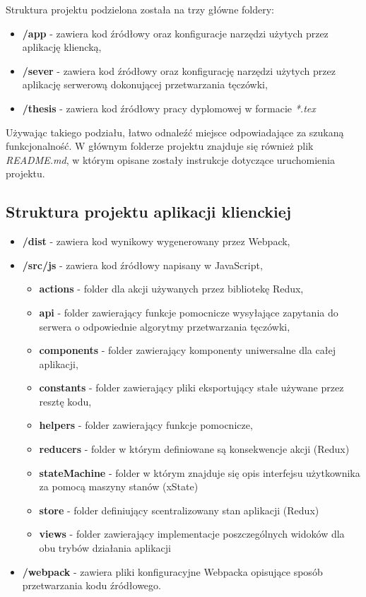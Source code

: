 \documentclass[10pt,polish,a4paper,oneside]{ppfcmthesis}
\begin{document}
Struktura projektu podzielona została na trzy główne foldery:

\begin{itemize}
  \item \textbf{/app} - zawiera kod \'zródłowy oraz konfiguracje narzędzi użytych przez aplikację
  kliencką,
  \item \textbf{/sever} - zawiera kod \'zródłowy oraz konfigurację narzędzi użytych przez aplikację
  serwerową dokonującej przetwarzania tęczówki,
  \item \textbf{/thesis} - zawiera kod \'zródłowy pracy dyplomowej w formacie \textit{*.tex}
\end{itemize}

Używając takiego podziału, łatwo odnale\'z\'c miejsce odpowiadające za szukaną funkcjonalnoś\'c.
W głównym folderze projektu znajduje się również plik \textit{README.md}, w którym opisane zostały
instrukcje dotyczące uruchomienia projektu.

\subsection{Struktura projektu aplikacji klienckiej}

\begin{itemize}
  \item \textbf{/dist} - zawiera kod wynikowy wygenerowany przez Webpack,
  \item \textbf{/src/js} - zawiera kod \'zródłowy napisany w JavaScript,
  \begin{itemize}
    \item \textbf{actions} - folder dla akcji używanych przez bibliotekę Redux,
    \item \textbf{api} - folder zawierający funkcje pomocnicze wysyłające zapytania do serwera o odpowiednie algorytmy
    przetwarzania tęczówki,
    \item \textbf{components} - folder zawierający komponenty uniwersalne dla całej aplikacji,
    \item \textbf{constants} - folder zawierający pliki eksportujący stałe używane przez resztę kodu,
    \item \textbf{helpers} - folder zawierający funkcje pomocnicze,
    \item \textbf{reducers} - folder w którym definiowane są konsekwencje akcji (Redux)
    \item \textbf{stateMachine} - folder w którym znajduje się opis interfejsu użytkownika za pomocą
    maszyny stanów (xState)
    \item \textbf{store} - folder definiujący scentralizowany stan aplikacji (Redux)
    \item \textbf{views} - folder zawierający implementacje poszczególnych widoków dla obu trybów działania aplikacji
  \end{itemize}
  \item \textbf{/webpack} - zawiera pliki konfiguracyjne Webpacka opisujące sposób przetwarzania kodu \'zródłowego.
\end{itemize}
\end{document}
